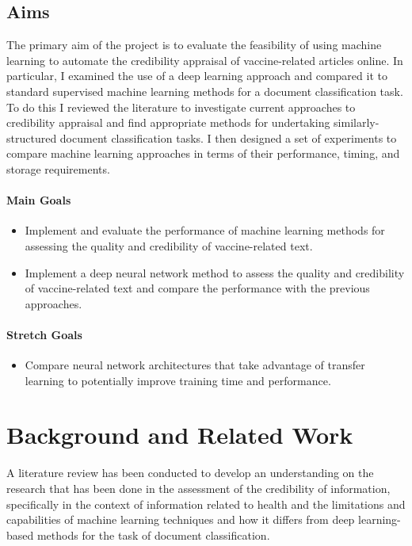 \documentclass[a4paper,twoside,phd]{BYUPhys}
\begin{document}
\section{Aims}
\label{sec:Aims}

The primary aim of the project is to evaluate the feasibility of using machine learning to automate the credibility appraisal of vaccine-related articles online. In particular, I examined the use of a deep learning approach and compared it to standard supervised machine learning methods for a document classification task. To do this I reviewed the literature to investigate current approaches to credibility appraisal and find appropriate methods for undertaking similarly-structured document classification tasks. I then designed a set of experiments to compare machine learning approaches in terms of their performance, timing, and storage requirements.

\subsubsection{Main Goals}
\label{sec:MainGoals}
\begin{itemize}
	\item Implement and evaluate the performance of machine learning methods for assessing the quality and credibility of vaccine-related text.
	\item Implement a deep neural network method to assess the quality and credibility of vaccine-related text and compare the performance with the previous approaches.
\end{itemize}

\subsubsection{Stretch Goals}
\label{sec:StretchGoals}
\begin{itemize}
	\item Compare neural network architectures that take advantage of transfer learning to potentially improve training time and performance.
\end{itemize}


\chapter{Background and Related Work}
\label{chap:LitReview}

A literature review has been conducted to develop an understanding on the research that has been done in the assessment of the credibility of information, specifically in the context of information related to health and the limitations and capabilities of machine learning techniques and how it differs from deep learning-based methods for the task of document classification. 
\end{document}
